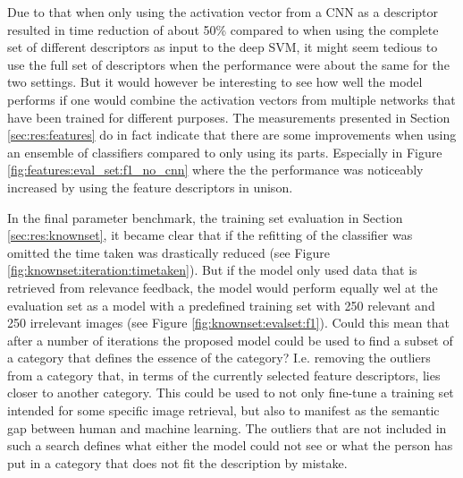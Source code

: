 Due to that when only using the activation vector from a CNN as a descriptor resulted in time reduction of about 50\% compared to when using the complete set of different descriptors as input to the deep SVM, it might seem tedious to use the full set of descriptors when the performance were about the same for the two settings. But it would however be interesting to see how well the model performs if one would combine the activation vectors from multiple networks that have been trained for different purposes. The measurements presented in Section \ref{sec:res:features} do in fact indicate that there are some improvements when using an ensemble of classifiers compared to only using its parts. Especially in Figure \ref{fig:features:eval_set:f1_no_cnn} where the the performance was noticeably increased by using the feature descriptors in unison. 

In the final parameter benchmark, the training set evaluation in Section \ref{sec:res:knownset}, it became clear that if the refitting of the classifier was omitted the time taken was drastically reduced (see Figure \ref{fig:knownset:iteration:timetaken}). But if the model only used data that is retrieved from relevance feedback, the model would perform equally wel at the evaluation set as a model with a predefined training set with 250 relevant and 250 irrelevant images (see Figure \ref{fig:knownset:evalset:f1}). Could this mean that after a number of iterations the proposed model could be used to find a subset of a category that defines the essence of the category? I.e. removing the outliers from a category that, in terms of the currently selected feature descriptors, lies closer to another category. This could be used to not only fine-tune a training set intended for some specific image retrieval, but also to manifest as the semantic gap between human and machine learning. The outliers that are not included in such a search defines what either the model could not see or what the person has put in a category that does not fit the description by mistake.

